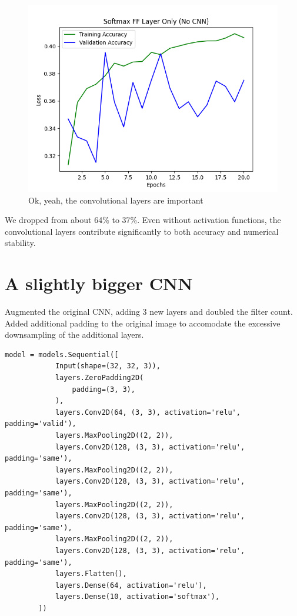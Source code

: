 \documentclass{article}
\begin{document}
    \begin{figure}[!htbp]
        \centerline{\includegraphics[width=0.55\columnwidth]{Softmax FF Layer Only (No CNN)}}
        \caption{Ok, yeah, the convolutional layers are important}
        \label{fig:ya-important}
    \end{figure}

    We dropped from about 64\% to 37\%.
    Even without activation functions, the convolutional layers contribute significantly to both accuracy and numerical stability.

    \section{A slightly bigger CNN}\label{sec:bigger}

    Augmented the original CNN, adding 3 new layers and doubled the filter count.
    Added additional padding to the original image to accomodate the excessive downsampling of the additional layers.

    \begin{lstlisting}[label={lst:bigger_code}]
        model = models.Sequential([
            Input(shape=(32, 32, 3)),
            layers.ZeroPadding2D(
                padding=(3, 3),
            ),
            layers.Conv2D(64, (3, 3), activation='relu', padding='valid'),
            layers.MaxPooling2D((2, 2)),
            layers.Conv2D(128, (3, 3), activation='relu', padding='same'),
            layers.MaxPooling2D((2, 2)),
            layers.Conv2D(128, (3, 3), activation='relu', padding='same'),
            layers.MaxPooling2D((2, 2)),
            layers.Conv2D(128, (3, 3), activation='relu', padding='same'),
            layers.MaxPooling2D((2, 2)),
            layers.Conv2D(128, (3, 3), activation='relu', padding='same'),
            layers.Flatten(),
            layers.Dense(64, activation='relu'),
            layers.Dense(10, activation='softmax'),
        ])
    \end{lstlisting}
\end{document}
